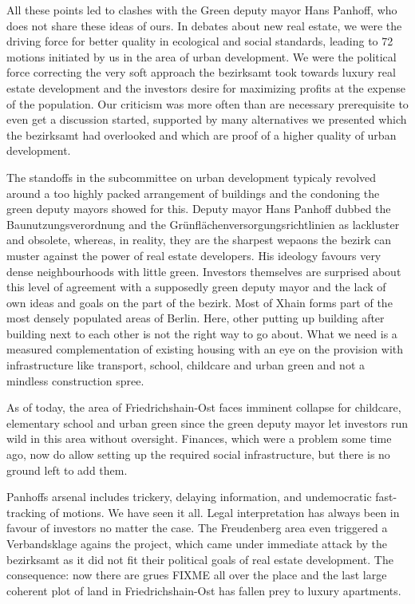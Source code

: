 \documentclass[a4paper,10pt]{article}
\begin{document}
All these points led to clashes with the Green deputy mayor Hans Panhoff, who does not share these ideas of ours. In debates about new real estate, we were the driving force for better quality in ecological and social standards, leading to 72 motions initiated by us in the area of urban development. We were the political force correcting the very soft approach the bezirksamt took towards luxury real estate development and the investors desire for maximizing profits at the expense of the population. Our criticism was more often than are necessary prerequisite to even get a discussion started, supported by many alternatives we presented which the bezirksamt had overlooked and which are proof of a higher quality of urban development.

The standoffs in the subcommittee on urban development typicaly revolved around a too highly packed arrangement of buildings and the condoning the green deputy mayors showed for this. Deputy mayor Hans Panhoff dubbed the Baunutzungsverordnung and the Grünflächenversorgungsrichtlinien as lackluster and obsolete, whereas, in reality, they are the sharpest wepaons the bezirk can muster against the power of real estate developers. His ideology favours very dense neighbourhoods with little green. Investors themselves are surprised about this level of agreement with  a supposedly green deputy mayor and the lack of own ideas and goals on the part of the bezirk.
Most of Xhain forms part of the most densely populated areas of Berlin. Here, other putting up building after building next to each other is not the right way to go about. What we need is a measured complementation of existing housing with an eye on the provision with infrastructure like transport, school, childcare and urban green and not a mindless construction spree.

As of today, the area of Friedrichshain-Ost faces imminent collapse for childcare, elementary school and urban green since the green deputy mayor let investors run wild in this area without oversight. Finances, which were a problem some time ago, now do allow setting up the required social infrastructure, but there is no ground left to add them. 

Panhoffs arsenal includes trickery, delaying information, and undemocratic fast-tracking of motions. We have seen it all. Legal interpretation has always been in favour of investors no matter the case. The Freudenberg area even triggered a Verbandsklage agains the project, which came under immediate attack by the bezirksamt as it did not fit their political goals of real estate development. The consequence: now there are grues FIXME all over the place and the last large coherent plot of land in Friedrichshain-Ost has fallen prey to luxury apartments.
\end{document}
